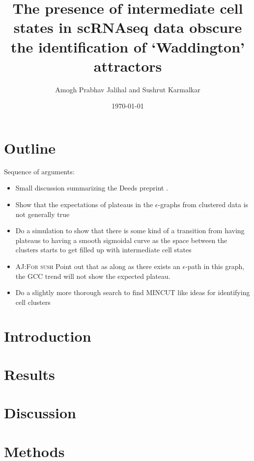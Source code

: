 \documentclass[11pt]{article}
\author{Amogh Prabhav Jalihal and Sushrut Karmalkar}
\date{\today}
\title{\amogh{wip} The presence of intermediate cell states in scRNAseq data obscure the identification of `Waddington' attractors }
\newcommand{\amogh}[1]{{\textsc{\color{blue} AJ:#1}}}
\newcommand{\todo}{{\color{red}{\small TODO\ }}}
\begin{document}
\maketitle
\section*{Outline}
Sequence of arguments:
\begin{itemize}
\item \todo Small discussion summarizing the Deeds preprint \cite{sparta22}.
\item \todo Show that the expectations of plateaus in the $\epsilon$-graphs from clustered data is not generally true
\item \todo Do a simulation to show that there is some kind of a transition from having plateaus to having a smooth sigmoidal curve as the space between the clusters starts to get filled up with intermediate cell states
\item \todo \amogh{For sush} Point out that as along as there exists an $\epsilon$-path in this graph, the GCC trend will not show the expected plateau.
\item \todo Do a slightly more thorough search to find \textsc{MINCUT} like ideas for identifying cell clusters
\end{itemize}


 
\section*{Introduction}
\label{sec:orgc8a6b0e}
\section*{Results}
\label{sec:org8da0183}
\section*{Discussion}
\label{sec:org4e03e49}

\section*{Methods}
\label{sec:org7a0bf76}


\end{document}
